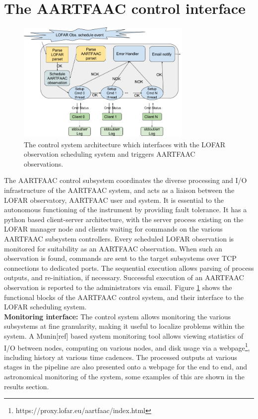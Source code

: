 \documentclass{ws-jai}
\begin{document}
\section {\label{sec:acontrol} The AARTFAAC control interface}
\begin{figure}[htbp]
\centering
\includegraphics[width=0.75\textwidth]{Figs/afaac_ctrl_system.png}
\caption{The  control  system  architecture  which  interfaces  with  the  LOFAR
  observation scheduling system and triggers AARTFAAC observations.}
\label{fig:afaac_ctrl_sys}
\end{figure}
The  AARTFAAC  control subsystem  coordinates  the  diverse processing  and  I/O
infrastructure of  the AARTFAAC system, and  acts as a liaison  between the LOFAR
observatory,  AARTFAAC user  and  system.   It is  essential  to the  autonomous
functioning of  the instrument by  providing fault  tolerance.  It has  a python
based client-server architecture, with the  server process existing on the LOFAR
manager node and clients waiting for  commands on the various AARTFAAC subsystem
controllers. Every scheduled  LOFAR observation is monitored  for suitability as
an AARTFAAC observation. When such an observation is found, commands are sent to
the target subsystems  over TCP connections to dedicated  ports.  The sequential
execution   allows   parsing   of   process  outputs,   and   re-initiation,   if
necessary. Successful  execution of an  AARTFAAC observation is reported  to the
administrators via email.  Figure  \ref{fig:afaac_ctrl_sys} shows the functional
blocks  of  the AARTFAAC  control  system,  and  their  interface to  the  LOFAR
scheduling system.\\  

\noindent \textbf  {Monitoring interface:} The control  system allows monitoring
the  various  subsystems at  fine  granularity,  making  it useful  to  localize
problems within  the system.  A  Munin[ref] based system monitoring  tool allows
viewing statistics  of I/O between nodes,  computing on various nodes,  and disk
usage   via    a   webpage\footnote{https://proxy.lofar.eu/aartfaac/index.html},
including history  at various time  cadences.  The processed outputs  at various
stages in the pipeline are also presented onto a webpage for the end to end, and
astronomical monitoring  of the system, some  examples of this are  shown in the
results section.
\end{document}
